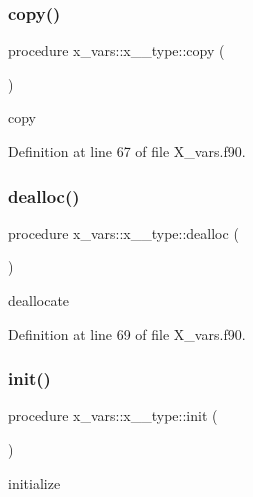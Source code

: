\subsubsection{\texorpdfstring{copy()}{copy()}}
{\footnotesize\ttfamily procedure x\+\_\+vars\+::x\+\_\+\_\+type\+::copy (\begin{DoxyParamCaption}{ }\end{DoxyParamCaption})}



copy 



Definition at line 67 of file X\+\_\+vars.\+f90.

\mbox{\label{structx__vars_1_1x__1__type_aee743fbc89e8e5486495ae3f6c49bd09}} 
\subsubsection{\texorpdfstring{dealloc()}{dealloc()}}
{\footnotesize\ttfamily procedure x\+\_\+vars\+::x\+\_\+\_\+type\+::dealloc (\begin{DoxyParamCaption}{ }\end{DoxyParamCaption})}



deallocate 



Definition at line 69 of file X\+\_\+vars.\+f90.

\mbox{\label{structx__vars_1_1x__1__type_a519c9ca8ceb73fb7010a587fab3248f8}} 
\subsubsection{\texorpdfstring{init()}{init()}}
{\footnotesize\ttfamily procedure x\+\_\+vars\+::x\+\_\+\_\+type\+::init (\begin{DoxyParamCaption}{ }\end{DoxyParamCaption})}



initialize 




